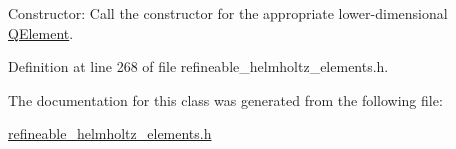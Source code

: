 Constructor\+: Call the constructor for the appropriate lower-\/dimensional \hyperlink{classoomph_1_1QElement}{Q\+Element}. 



Definition at line 268 of file refineable\+\_\+helmholtz\+\_\+elements.\+h.



The documentation for this class was generated from the following file\+:\begin{DoxyCompactItemize}
\item 
\hyperlink{refineable__helmholtz__elements_8h}{refineable\+\_\+helmholtz\+\_\+elements.\+h}\end{DoxyCompactItemize}
